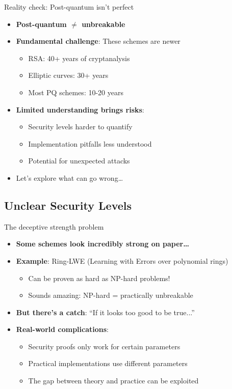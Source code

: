 \documentclass[aspectratio=169, lualatex, handout]{beamer}
\begin{document}
\begin{frame}{Reality check: Post-quantum isn't perfect}
	\begin{itemize}
		\item \textbf{Post-quantum $\neq$ unbreakable}
		\item \textbf{Fundamental challenge}: These schemes are newer
		      \begin{itemize}
			      \item RSA: 40+ years of cryptanalysis
			      \item Elliptic curves: 30+ years
			      \item Most PQ schemes: 10-20 years
		      \end{itemize}
		\item \textbf{Limited understanding brings risks}:
		      \begin{itemize}
			      \item Security levels harder to quantify
			      \item Implementation pitfalls less understood
			      \item Potential for unexpected attacks
		      \end{itemize}
		\item Let's explore what can go wrong\ldots
	\end{itemize}
\end{frame}

\subsection{Unclear Security Levels}

\begin{frame}{The deceptive strength problem}
	\begin{itemize}
		\item \textbf{Some schemes look incredibly strong on paper\ldots}
		\item \textbf{Example}: Ring-LWE (Learning with Errors over polynomial rings)
		      \begin{itemize}
			      \item Can be proven as hard as NP-hard problems!
			      \item Sounds amazing: NP-hard = practically unbreakable
		      \end{itemize}
		\item \textbf{But there's a catch}: ``If it looks too good to be true...''
		\item \textbf{Real-world complications}:
		      \begin{itemize}
			      \item Security proofs only work for certain parameters
			      \item Practical implementations use different parameters
			      \item The gap between theory and practice can be exploited
		      \end{itemize}
	\end{itemize}
\end{frame}
\end{document}

